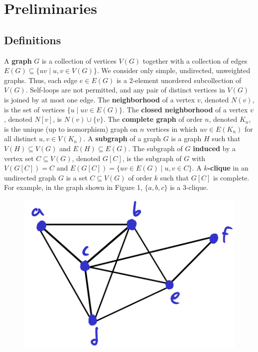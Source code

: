 \documentclass[12pt]{article}
\begin{document}
\section*{Preliminaries}

\subsection*{Definitions}
    A \textbf{graph} $G$ is a collection of vertices $V(G)$ together with a collection of edges $E(G) \subseteq \{uv \mid u,v \in V(G)\}$.
    We consider only simple, undirected, unweighted graphs.
    Thus, each edge $e \in E(G)$ is a 2-element unordered subcollection of $V(G)$.
    Self-loops are not permitted, and any pair of distinct vertices in $V(G)$ is joined by at most one edge.
    The \textbf{neighborhood} of a vertex $v$, denoted $N(v)$, is the set of vertices $\{u \mid uv \in E(G)\}$.
    The \textbf{closed neighborhood} of a vertex $v$, denoted $N[v]$, is $N(v) \cup \{v\}$.
    The \textbf{complete graph} of order $n$, denoted $K_n$, is the unique (up to isomorphism) graph on $n$ vertices in which $uv \in E(K_n)$ for all distinct $u,v \in V(K_n)$.
    A \textbf{subgraph} of a graph $G$ is a graph $H$ such that $V(H) \subseteq V(G)$ and $E(H) \subseteq E(G)$.
    The subgraph of $G$ \textbf{induced} by a vertex set $C \subseteq V(G)$, denoted $G[C]$, is the subgraph of $G$ with $V(G[C]) = C$ and $E(G[C]) = \{uv \in E(G) \mid u, v \in C\}$.
    A \textbf{$k$-clique} in an undirected graph $G$ is a set $C \subseteq V(G)$ of order $k$ such that $G[C]$ is complete.
    For example, in the graph shown in Figure 1, $\{a, b, c\}$ is a 3-clique.
    \begin{figure}[hbt!]
    \begin{center}
        \includegraphics[scale=.6]{fig1.png} %
        \caption{}
    \end{center}
    \end{figure}
\end{document}
